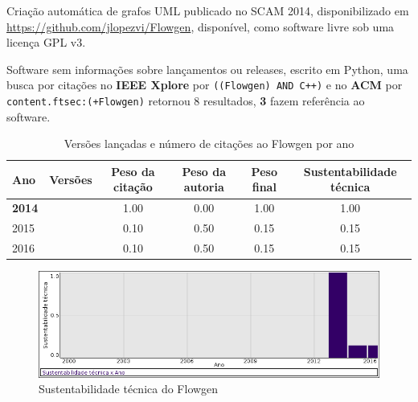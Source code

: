 Criação automática de grafos UML
publicado no SCAM 2014,
disponibilizado em \url{https://github.com/jlopezvi/Flowgen},
disponível,
como software livre
sob uma licença GPL v3.

Software sem informações sobre lançamentos ou releases,
escrito em Python,
uma busca por citações no {\bf IEEE Xplore} por
\texttt{((Flowgen) AND C++)}
e no {\bf ACM} por
\texttt{content.ftsec:(+Flowgen)}
retornou
8 resultados,
{\bf 3} fazem referência ao software.


\begin{table}[H]
\caption{Versões lançadas e número de citações ao Flowgen por ano}
\centering
\begin{tabular}{| l | c | c | c | c | c |}
  \hline
  Ano & Versões & Peso da citação & Peso da autoria & Peso final & Sustentabilidade técnica \\
  \hline
            {\bf 2014}
          &
          
          &
          1.00
          &
          0.00
          &
          1.00
          &
            {\color{blue} 1.00}
          \\
\hline
            2015
          &
          
          &
          0.10
          &
          0.50
          &
          0.15
          &
            {\color{red} 0.15}
          \\
\hline
            2016
          &
          
          &
          0.10
          &
          0.50
          &
          0.15
          &
            {\color{red} 0.15}
          \\
\hline
\end{tabular}
\end{table}

\begin{figure}[h]
  \center
  \includegraphics[scale=0.50]{result-documents/charts/flowgen.png}
  \caption{Sustentabilidade técnica do Flowgen}
\end{figure}


